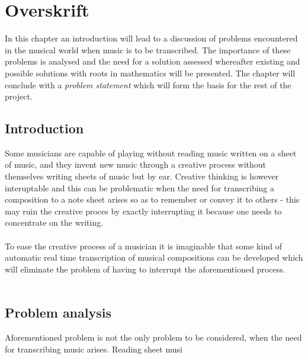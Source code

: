 \chapter{Overskrift} \label{ch1}
In this chapter an introduction will lead to a discussion of problems encountered in the musical world when music is to be transcribed. The importance of these problems is analysed and the need for a solution assessed whereafter existing and possible solutions with roots in mathematics will be presented. The chapter will conclude with a \textit{problem statement} which will form the basis for the rest of the project.
\section{Introduction}
Some musicians are capable of playing without reading music written on a sheet of music, and they invent new music through a creative process without themselves writing sheets of music but by ear. Creative thinking is however interuptable and this can be problematic when the need for transcribing a composition to a note sheet arises so as to remember or convey it to others - this may ruin the creative proces by exactly interrupting it because one needs to concentrate on the writing.\\\\
To ease the creative process of a musician it is imaginable that some kind of automatic real time transcription of musical compositions can be developed which will eliminate the problem of having to interrupt the aforementioned process.\\\\
\section{Problem analysis}
Aforementioned problem is not the only problem to be considered, when the need for transcribing music arises. Reading sheet musi
%
